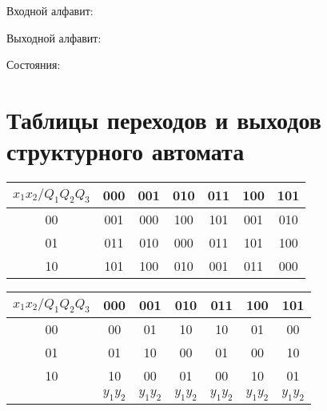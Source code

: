 \documentclass[listings]{labreport}
\begin{document}
Входной алфавит:


Выходной алфавит:


Состояния:


\section*{Таблицы переходов и выходов структурного автомата}

\begin{tabular}{|*{7}{c|}}
\hline
$x_1x_2/Q_1Q_2Q_3$ & 000 & 001 & 010 & 011 & 100 & 101\\\hline
00 & 001 & 000 & 100 & 101 & 001 & 010\\\hline
01 & 011 & 010 & 000 & 011 & 101 & 100\\\hline
10 & 101 & 100 & 010 & 001 & 011 & 000\\\hline
\end{tabular}

\begin{tabular}{|*{7}{c|}}
\hline
$x_1x_2/Q_1Q_2Q_3$ & 000 & 001 & 010 & 011 & 100 & 101\\\hline
00 & 00 & 01 & 10 & 10 & 01 & 00\\\hline
01 & 01 & 10 & 00 & 01 & 00 & 10\\\hline
10 & 10 & 00 & 01 & 00 & 10 & 01\\\hline
 & $y_1y_2$ & $y_1y_2$ & $y_1y_2$ & $y_1y_2$ & $y_1y_2$ & $y_1y_2$\\\hline
\end{tabular}
\end{document}
